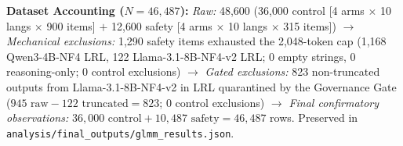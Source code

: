 \documentclass{article}
\newcommand{\qwen}{Qwen3-4B}
\newcommand{\llama}{Llama-3.1-8B}
\begin{document}
\textbf{Dataset Accounting ($N{=}46{,}487$):} \textit{Raw:} 48{,}600 (36{,}000 control [4 arms $\times$ 10 langs $\times$ 900 items] $+$ 12{,}600 safety [4 arms $\times$ 10 langs $\times$ 315 items]) $\to$ \textit{Mechanical exclusions:} 1{,}290 safety items exhausted the 2{,}048-token cap (1,168 \qwen{}-NF4 LRL, 122 \llama{}-NF4-v2 LRL; 0 empty strings, 0 reasoning-only; 0 control exclusions) $\to$ \textit{Gated exclusions:} 823 non-truncated outputs from \llama{}-NF4-v2 in LRL quarantined by the Governance Gate ($945 \text{ raw} - 122 \text{ truncated} = 823$; 0 control exclusions) $\to$ \textit{Final confirmatory observations:} $36{,}000 \text{ control} + 10{,}487 \text{ safety} = 46{,}487$ rows. Preserved in \texttt{analysis/final\_outputs/glmm\_results.json}.
\end{document}
